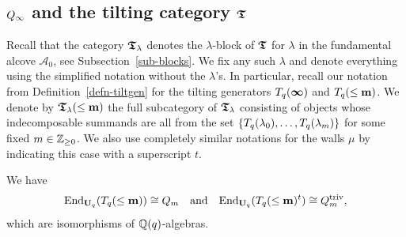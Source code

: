 


\subsection{\texorpdfstring{$Q_{\infty}$}{Ain} and the tilting category \texorpdfstring{$\boldsymbol{\mathfrak{T}}$}{T}}\label{sub-ainfty}
Recall that the category 
$\boldsymbol{\mathfrak{T}}_{\lambda}$ denotes the 
$\lambda$-block of $\boldsymbol{\mathfrak{T}}$ for $\lambda$ 
in the fundamental alcove $\mathcal A_0$, see Subsection~\ref{sub-blocks}. 
We fix any such $\lambda$ and denote everything 
using the simplified notation without the $\lambda$'s. In particular, recall our notation from Definition~\ref{defn-tiltgen} for the tilting generators $T_q({\boldsymbol{\infty}})$ and $T_q({\leq\boldsymbol{\mathrm{m}}})$.
We denote by $\boldsymbol{\mathfrak{T}}_{\lambda}(\leq\boldsymbol{\mathrm{m}})$ the 
full subcategory of $\boldsymbol{\mathfrak{T}}_{\lambda}$ consisting of 
objects whose indecomposable summands are all from 
the set $\{T_q({\lambda_0}),\dots,T_q({\lambda_m})\}$ for some fixed $m\in\mathbb{Z}_{\geq 0}$.
We also use completely similar notations for 
the walls $\mu$ by indicating this case with a superscript $t$. 




\begin{prop}\label{prop-isoofalg1}
We have
\[
\mathrm{End}_{\boldsymbol{\mathrm{U}}_q}(T_q({\leq\boldsymbol{\mathrm{m}}}))\cong Q_{m}\quad\text{and}\quad\mathrm{End}_{\boldsymbol{\mathrm{U}}_q}(T_q({\leq\boldsymbol{\mathrm{m}}})^t)\cong Q_m^{\mathrm{triv}},
\]
which are isomorphisms of $\mathbb{Q}(q)$-algebras.\makeqed
\end{prop}




